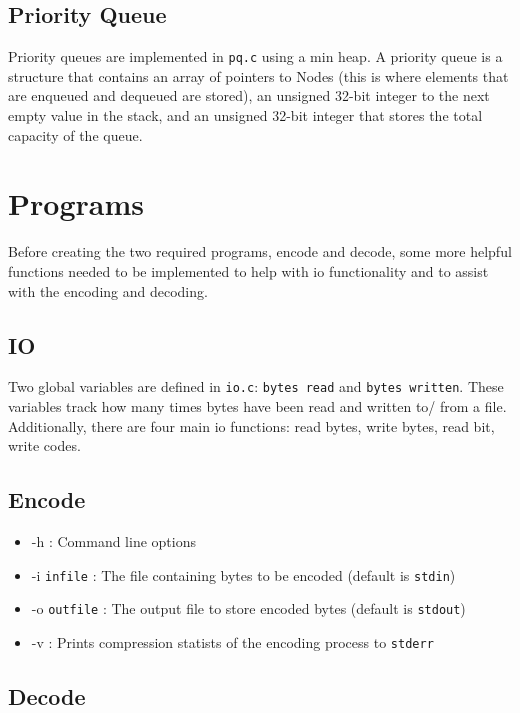 \documentclass[12pt]{article}
\def\code#1{\texttt{#1}} %
\begin{document}
\subsection{Priority Queue}

Priority queues are implemented in \code{pq.c} using a min heap. A priority queue
is a structure that contains an array of pointers to Nodes (this is where elements
that are enqueued and dequeued are stored), an unsigned 32-bit integer to the next
empty value in the stack, and an unsigned 32-bit integer that stores the total
capacity of the queue.

\section{Programs}

Before creating the two required programs, encode and decode, some more helpful
functions needed to be implemented to help with io functionality and to assist
with the encoding and decoding.

\subsection{IO}

Two global variables are defined in \code{io.c}: \code{bytes read} and \code{bytes written}.
These variables track how many times bytes have been read and written to/ from a file.
Additionally, there are four main io functions: read bytes, write bytes, read bit, write codes.

\subsection{Encode}

\begin{itemize}
    \item{-h : Command line options}
	\item{-i \code{infile} : The file containing bytes to be encoded (default is \code{stdin})}
	\item{-o \code{outfile} : The output file to store encoded bytes (default is \code{stdout})}
	\item{-v : Prints compression statists of the encoding process to \code{stderr}}
\end{itemize}

\subsection{Decode}
\end{document}

